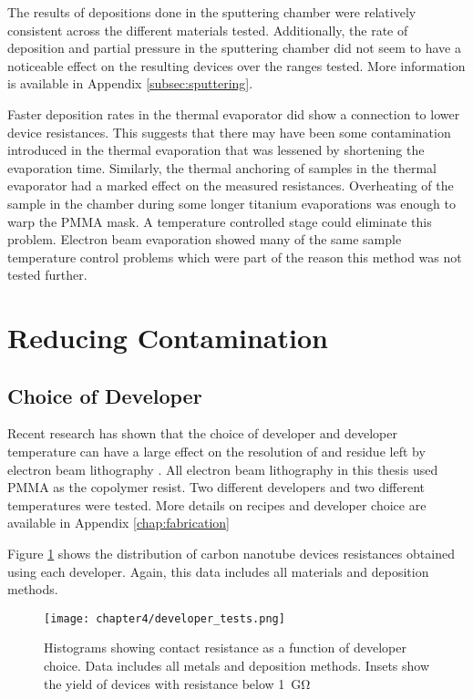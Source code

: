 The results of depositions done in the sputtering chamber were relatively consistent across the different materials tested. Additionally, the rate of deposition and partial pressure in the sputtering chamber did not seem to have a noticeable effect on the resulting devices over the ranges tested. More information is available in Appendix \ref{subsec:sputtering}. 

Faster deposition rates in the thermal evaporator did show a connection to lower device resistances. This suggests that there may have been some contamination introduced in the thermal evaporation that was lessened by shortening the evaporation time. Similarly, the thermal anchoring of samples in the thermal evaporator had a marked effect on the measured resistances. Overheating of the sample in the chamber during some longer titanium evaporations was enough to warp the PMMA mask. A temperature controlled stage could eliminate this problem. Electron beam evaporation showed many of the same sample temperature control problems which were part of the reason this method was not tested further.

\section{Reducing Contamination}

\subsection{Choice of Developer}
\label{subsec:developer_choice}

Recent research has shown that the choice of developer and developer temperature can have a large effect on the resolution of and residue left by electron beam lithography \cite{Maximov2009, Macintyre2009, Aurich2012}. All electron beam lithography in this thesis used PMMA as the copolymer resist. Two different developers and two different temperatures were tested. More details on recipes and developer choice are available in Appendix \ref{chap:fabrication}

Figure \ref{fig:developer_tests} shows the distribution of carbon nanotube devices resistances obtained using each developer. Again, this data includes all materials and deposition methods.

\begin{figure}
    \centering
    \texttt{[image: chapter4/developer\_tests.png]}
    \caption{Histograms showing contact resistance as a function of developer choice. Data includes all metals and deposition methods. Insets show the yield of devices with resistance below \SI{1}{\giga\ohm}}
    \label{fig:developer_tests}
\end{figure}

